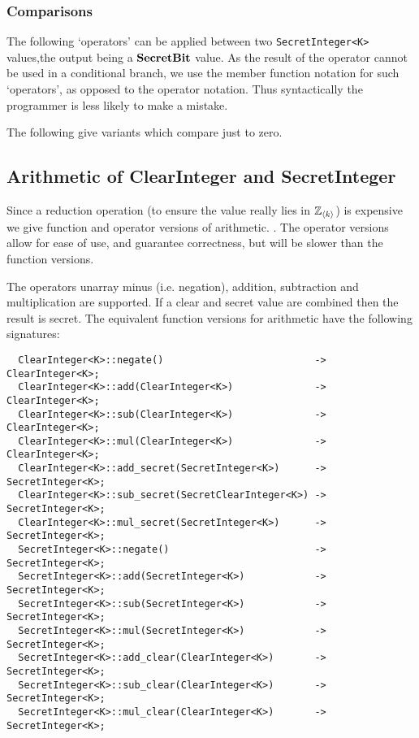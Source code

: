 \subsubsection{Comparisons}
The following `operators' can be applied between two \verb|SecretInteger<K>| 
values,the output being a $\mathbf{SecretBit}$ value.
As the result of the operator cannot be used in a conditional branch,
we use the member function notation for such `operators', as opposed
to the operator notation. Thus syntactically the programmer is less
likely to make a mistake.

\noindent
The following give variants which compare just to zero.

\subsection{Arithmetic of ClearInteger and SecretInteger}
Since a reduction operation (to ensure the value really lies in
${\mathbb{Z}}_{\langle k \rangle}$) is expensive we give function and operator versions of arithmetic.
.
The operator versions allow for ease of use, and guarantee correctness,
but will be slower than the function versions.

The operators unarray minus (i.e. negation), addition, subtraction
and multiplication are supported. If a clear and secret value are
combined then the result is secret.
The equivalent function versions for arithmetic have the following signatures:
\begin{lstlisting}
  ClearInteger<K>::negate()                          -> ClearInteger<K>;
  ClearInteger<K>::add(ClearInteger<K>)              -> ClearInteger<K>;
  ClearInteger<K>::sub(ClearInteger<K>)              -> ClearInteger<K>;
  ClearInteger<K>::mul(ClearInteger<K>)              -> ClearInteger<K>;
  ClearInteger<K>::add_secret(SecretInteger<K>)      -> SecretInteger<K>;
  ClearInteger<K>::sub_secret(SecretClearInteger<K>) -> SecretInteger<K>;
  ClearInteger<K>::mul_secret(SecretInteger<K>)      -> SecretInteger<K>;
  SecretInteger<K>::negate()                         -> SecretInteger<K>;
  SecretInteger<K>::add(SecretInteger<K>)            -> SecretInteger<K>;
  SecretInteger<K>::sub(SecretInteger<K>)            -> SecretInteger<K>;
  SecretInteger<K>::mul(SecretInteger<K>)            -> SecretInteger<K>;
  SecretInteger<K>::add_clear(ClearInteger<K>)       -> SecretInteger<K>;
  SecretInteger<K>::sub_clear(ClearInteger<K>)       -> SecretInteger<K>;
  SecretInteger<K>::mul_clear(ClearInteger<K>)       -> SecretInteger<K>;
\end{lstlisting}
